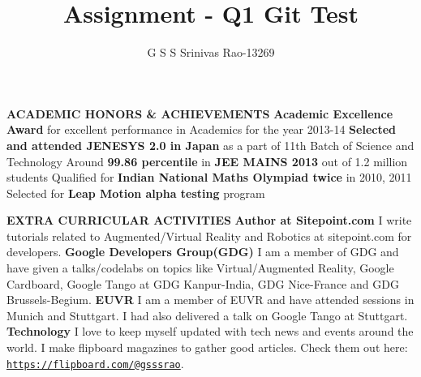 \documentclass[9pt]{article}
\title{Assignment - Q1 Git\cite{Github} Test}
\author{G S S Srinivas Rao-13269}
\date{}
\begin{document}
\maketitle

\vspace{0.5cm}
\raggedright
\textbf{\large{ACADEMIC HONORS \& ACHIEVEMENTS}}\vspace{0.1cm}
\newline
\textbf{Academic Excellence Award} for excellent performance in Academics for the year 2013-14
\newline
\textbf{Selected and attended JENESYS 2.0\cite{Jenesys} in Japan} as a part of 11th Batch of Science and Technology
\newline
Around \textbf{99.86 percentile} in \textbf{JEE MAINS 2013} out of 1.2 million students
\newline
Qualified for \textbf{Indian National Maths Olympiad twice} in 2010, 2011
\newline
Selected for \textbf{Leap Motion alpha testing} program

\vspace{0.5cm}
\raggedright
\textbf{\large{EXTRA CURRICULAR ACTIVITIES}}\vspace{0.1cm}
\newline
\textbf{Author at Sitepoint.com} I write tutorials related to Augmented/Virtual Reality and Robotics at sitepoint.com for developers.
\newline
\textbf{Google Developers Group(GDG) }{I am a member of GDG and have given a talks/codelabs on topics like Virtual/Augmented Reality, Google Cardboard, Google Tango at GDG Kanpur-India, GDG Nice-France and GDG Brussels-Begium.}
\newline
\textbf{EUVR }{I am a member of EUVR and have attended sessions in Munich and Stuttgart. I had also delivered a talk on Google Tango at Stuttgart.}
\newline
\textbf{Technology }{{I love to keep myself updated with tech news and events around the world. I make flipboard magazines to gather good articles. Check them out here: \underline{\texttt{https://flipboard.com/@gsssrao}}}}.



\end{document}
